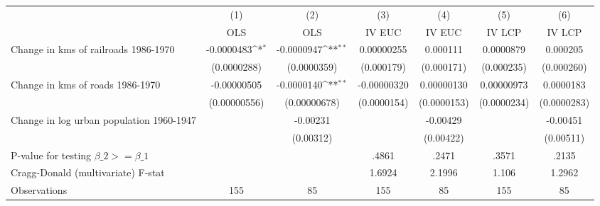 {
\def\sym#1{\ifmmode^{#1}\else\(^{#1}\)\fi}
\begin{tabular}{l*{6}{c}}
\hline\hline
                &\multicolumn{1}{c}{(1)}&\multicolumn{1}{c}{(2)}&\multicolumn{1}{c}{(3)}&\multicolumn{1}{c}{(4)}&\multicolumn{1}{c}{(5)}&\multicolumn{1}{c}{(6)}\\
                &\multicolumn{1}{c}{OLS}&\multicolumn{1}{c}{OLS}&\multicolumn{1}{c}{IV EUC}&\multicolumn{1}{c}{IV EUC}&\multicolumn{1}{c}{IV LCP}&\multicolumn{1}{c}{IV LCP}\\
\hline
Change in kms of railroads 1986-1970&-0.0000483\sym{*}  &-0.0000947\sym{**} &0.00000255         & 0.000111         &0.0000879         & 0.000205         \\
                &(0.0000288)         &(0.0000359)         &(0.000179)         &(0.000171)         &(0.000235)         &(0.000260)         \\
[1em]
Change in kms of roads 1986-1970&-0.00000505         &-0.0000140\sym{**} &-0.00000320         &0.00000130         &0.00000973         &0.0000183         \\
                &(0.00000556)         &(0.00000678)         &(0.0000154)         &(0.0000153)         &(0.0000234)         &(0.0000283)         \\
[1em]
Change in log urban population 1960-1947&                  & -0.00231         &                  & -0.00429         &                  & -0.00451         \\
                &                  &(0.00312)         &                  &(0.00422)         &                  &(0.00511)         \\
\hline
P-value for testing $\beta\_{2} >= \beta\_{1}$&                  &                  &    .4861         &    .2471         &    .3571         &    .2135         \\
Cragg-Donald (multivariate) F-stat&                  &                  &   1.6924         &   2.1996         &    1.106         &   1.2962         \\
Observations    &      155         &       85         &      155         &       85         &      155         &       85         \\
\hline\hline
\end{tabular}
}
